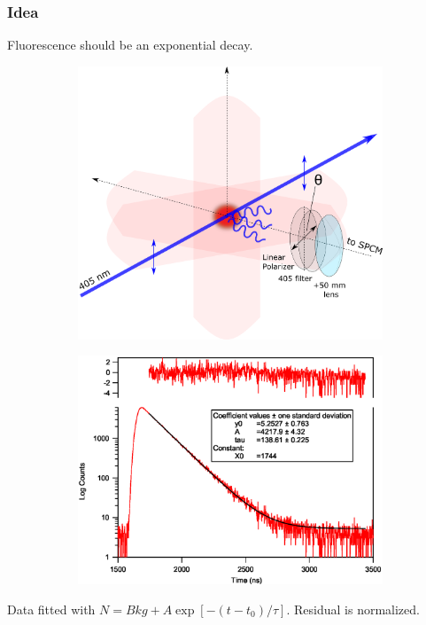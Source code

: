 \documentclass{beamer}
\theoremstyle{definition}
\begin{document}
\begin{frame}
\frametitle{Idea}
Fluorescence should be an exponential decay. 

\begin{figure}[!htb]
	\vspace{-10pt}
	\centering
	\begin{subfigure}{0.55\textwidth}
		\includegraphics[width=\textwidth]{experimental_geometry}
	\end{subfigure}
	\begin{subfigure}{0.4\textwidth}
		\includegraphics[width=\textwidth]{p12_70ns_pol.eps}
	\end{subfigure}
\end{figure}

Data fitted with $N = Bkg + A\exp[-(t-t_0)/\tau]$. Residual is normalized. 

\end{frame}
\end{document}
